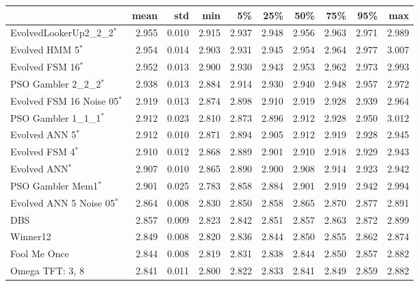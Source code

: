\begin{tabular}{lrrrrrrrrr}
\toprule
{} &   mean &    std &    min &     5\% &    25\% &    50\% &    75\% &    95\% &    max \\
\midrule
EvolvedLookerUp2\_2\_2$^{*}$    &  2.955 &  0.010 &  2.915 &  2.937 &  2.948 &  2.956 &  2.963 &  2.971 &  2.989 \\
Evolved HMM 5$^{*}$           &  2.954 &  0.014 &  2.903 &  2.931 &  2.945 &  2.954 &  2.964 &  2.977 &  3.007 \\
Evolved FSM 16$^{*}$          &  2.952 &  0.013 &  2.900 &  2.930 &  2.943 &  2.953 &  2.962 &  2.973 &  2.993 \\
PSO Gambler 2\_2\_2$^{*}$       &  2.938 &  0.013 &  2.884 &  2.914 &  2.930 &  2.940 &  2.948 &  2.957 &  2.972 \\
Evolved FSM 16 Noise 05$^{*}$ &  2.919 &  0.013 &  2.874 &  2.898 &  2.910 &  2.919 &  2.928 &  2.939 &  2.964 \\
PSO Gambler 1\_1\_1$^{*}$       &  2.912 &  0.023 &  2.810 &  2.873 &  2.896 &  2.912 &  2.928 &  2.950 &  3.012 \\
Evolved ANN 5$^{*}$           &  2.912 &  0.010 &  2.871 &  2.894 &  2.905 &  2.912 &  2.919 &  2.928 &  2.945 \\
Evolved FSM 4$^{*}$           &  2.910 &  0.012 &  2.868 &  2.889 &  2.901 &  2.910 &  2.918 &  2.929 &  2.943 \\
Evolved ANN$^{*}$             &  2.907 &  0.010 &  2.865 &  2.890 &  2.900 &  2.908 &  2.914 &  2.923 &  2.942 \\
PSO Gambler Mem1$^{*}$        &  2.901 &  0.025 &  2.783 &  2.858 &  2.884 &  2.901 &  2.919 &  2.942 &  2.994 \\
Evolved ANN 5 Noise 05$^{*}$  &  2.864 &  0.008 &  2.830 &  2.850 &  2.858 &  2.865 &  2.870 &  2.877 &  2.891 \\
DBS                           &  2.857 &  0.009 &  2.823 &  2.842 &  2.851 &  2.857 &  2.863 &  2.872 &  2.899 \\
Winner12                      &  2.849 &  0.008 &  2.820 &  2.836 &  2.844 &  2.850 &  2.855 &  2.862 &  2.874 \\
Fool Me Once                  &  2.844 &  0.008 &  2.819 &  2.831 &  2.838 &  2.844 &  2.850 &  2.857 &  2.882 \\
Omega TFT: 3, 8               &  2.841 &  0.011 &  2.800 &  2.822 &  2.833 &  2.841 &  2.849 &  2.859 &  2.882 \\
\bottomrule
\end{tabular}

